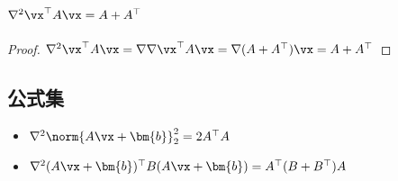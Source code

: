         \subsection{\texorpdfstring{$\nabla^2 \vx^\top A\vx = A+A^\top$}{∇\string^2 x\string^⊤ Ax = A+A\string^⊤}}
            \begin{proof}
                $\nabla^2\vx^\top A\vx = \nabla \nabla\vx^\top A\vx = \nabla(A+A^\top)\vx = A+A^\top$
            \end{proof}
        \subsection{公式集}
            \begin{itemize}
                \item $\nabla^2 \norm{A\vx+\bm{b}}_2^2 = 2A^\top A$
                \item $\nabla^2 (A\vx+\bm{b})^\top B(A\vx+\bm{b}) = A^\top(B+B^\top)A$
            \end{itemize}
